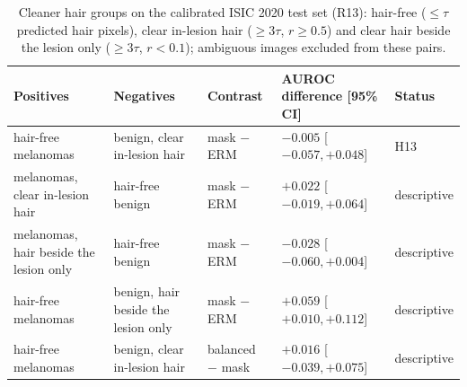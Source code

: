 \begin{table}[H]\centering\scriptsize
\caption{Cleaner hair groups on the calibrated ISIC 2020 test set (R13): hair-free ($\le\tau$ predicted hair pixels), clear in-lesion hair ($\ge3\tau$, $r\ge0.5$) and clear hair beside the lesion only ($\ge3\tau$, $r<0.1$); ambiguous images excluded from these pairs.}\label{tab:r13}
\begin{tabular}{p{3.4cm}p{3.4cm}p{2.0cm}p{3.4cm}p{1.6cm}}\toprule
Positives & Negatives & Contrast & AUROC difference [95\% CI] & Status \\\midrule
hair-free melanomas & benign, clear in-lesion hair & mask $-$ ERM & $-0.005$ [$-0.057, +0.048$] & H13 \\
melanomas, clear in-lesion hair & hair-free benign & mask $-$ ERM & $+0.022$ [$-0.019, +0.064$] & descriptive \\
melanomas, hair beside the lesion only & hair-free benign & mask $-$ ERM & $-0.028$ [$-0.060, +0.004$] & descriptive \\
hair-free melanomas & benign, hair beside the lesion only & mask $-$ ERM & $+0.059$ [$+0.010, +0.112$] & descriptive \\
hair-free melanomas & benign, clear in-lesion hair & balanced $-$ mask & $+0.016$ [$-0.039, +0.075$] & descriptive \\
\bottomrule\end{tabular}
\end{table}
